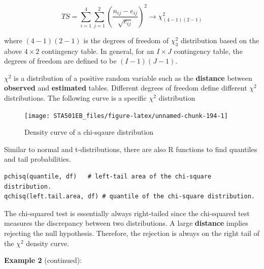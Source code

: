 \documentclass[
]{book}
\newenvironment{Shaded}{\begin{snugshade}}{\end{snugshade}}
\newcommand{\AttributeTok}[1]{\textcolor[rgb]{0.13,0.29,0.53}{#1}}
\newcommand{\DecValTok}[1]{\textcolor[rgb]{0.00,0.00,0.81}{#1}}
\newcommand{\DocumentationTok}[1]{\textcolor[rgb]{0.56,0.35,0.01}{\textbf{\textit{#1}}}}
\newcommand{\FloatTok}[1]{\textcolor[rgb]{0.00,0.00,0.81}{#1}}
\newcommand{\FunctionTok}[1]{\textcolor[rgb]{0.13,0.29,0.53}{\textbf{#1}}}
\newcommand{\NormalTok}[1]{#1}
\newcommand{\OtherTok}[1]{\textcolor[rgb]{0.56,0.35,0.01}{#1}}
\newcommand{\SpecialCharTok}[1]{\textcolor[rgb]{0.81,0.36,0.00}{\textbf{#1}}}
\newcommand{\StringTok}[1]{\textcolor[rgb]{0.31,0.60,0.02}{#1}}
\begin{document}
\[
TS = \sum_{i=1}^4\sum_{j=1}^2 \left(\frac{n_{ij}-e_{ij}}{\sqrt{e_{ij}}} \right)^2 \to \chi^2_{(4-1)(2-1)}
\]

where \((4-1)(2-1)\) is the degrees of freedom of \(\chi^2_3\) distribution based on the above \(4\times2\) contingency table. In general, for an \(I\times J\) contingency table, the degrees of freedom are defined to be \((I-1)(J-1)\).

\(\chi^2\) is a distribution of a positive random variable such as the \textbf{distance} between \textbf{observed} and \textbf{estimated} tables. Different degrees of freedom define different \(\chi^2\) distributions. The following curve is a specific \(\chi^2\) distribution

\begin{figure}

{\centering \texttt{[image: STA501EB\_files/figure-latex/unnamed-chunk-194-1]} 

}

\caption{Density curve of a chi-sqaure distribution}\label{fig:unnamed-chunk-194}
\end{figure}

Similar to normal and t-distributions, there are also R functions to find quantiles and tail probabilities.

\begin{verbatim}
pchisq(quantile, df)   # left-tail area of the chi-square distribution. 
qchisq(left.tail.area, df) # quantile of the chi-square distribution. 
\end{verbatim}

The chi-squared test is essentially always right-tailed since the chi-squared test measures the discrepancy between two distributions. A large \textbf{distance} implies rejecting the null hypothesis. Therefore, the rejection is always on the right tail of the \(\chi^2\) density curve.

\textbf{Example 2} (continued):

\begin{Shaded}
\end{Shaded}
\end{document}
